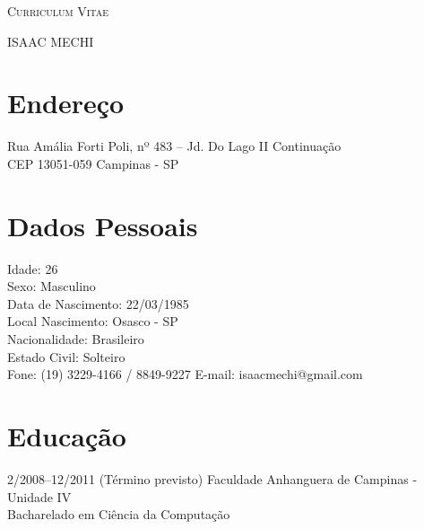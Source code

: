 \documentclass[a4paper]{article}
\begin{document}
\pagestyle{empty}

\begin{center}
\huge{\textsc{Curriculum Vitae}}
\vspace{\baselineskip}

\Large{\textsc{ISAAC MECHI}}
\end{center}
\vspace{1.5\baselineskip}

\section{Endereço}

\begin{flushleft}
	Rua Amália Forti Poli, nº 483 – Jd. Do Lago II Continuação \\
	CEP 13051-059 Campinas - SP
\end{flushleft}


\section{Dados Pessoais}
\begin{flushleft}
  Idade: 26 \\
  Sexo: Masculino \\
  Data de Nascimento: 22/03/1985 \\
  Local Nascimento: Osasco - SP \\
  Nacionalidade: Brasileiro \\
  Estado Civil: Solteiro \\
  Fone: (19) 3229-4166 / 8849-9227 E-mail: isaacmechi@gmail.com \\
\end{flushleft}


\section{Educação}
\begin{CV}
\item[2/2008--12/2011 (Término previsto)] Faculdade Anhanguera de Campinas - Unidade IV
\\Bacharelado em Ciência da Computação
\end{CV}
\end{document}
